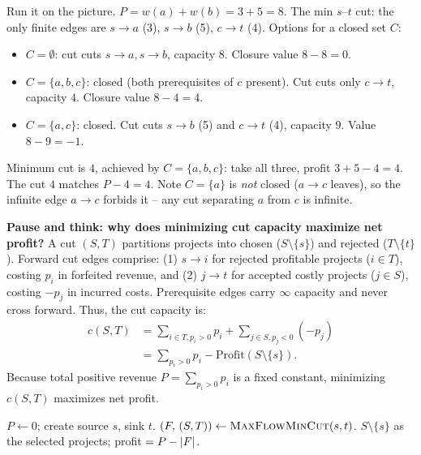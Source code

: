 \begin{labbox}
Run it on the picture. $P = w(a)+w(b) = 3+5 = 8$. The min $s$--$t$ cut: the only finite edges are $s\to a$ (3), $s\to b$ (5), $c\to t$ (4). Options for a closed set $C$:
\begin{itemize}
\item $C=\emptyset$: cut cuts $s\to a, s\to b$, capacity $8$. Closure value $8-8=0$.
\item $C=\{a,b,c\}$: closed (both prerequisites of $c$ present). Cut cuts only $c\to t$, capacity $4$. Closure value $8-4=4$.
\item $C=\{a,c\}$: closed. Cut cuts $s\to b$ (5) and $c\to t$ (4), capacity $9$. Value $8-9=-1$.
\end{itemize}
Minimum cut is $4$, achieved by $C=\{a,b,c\}$: take all three, profit $3+5-4 = 4$. The cut $4$ matches $P - 4 = 4$. Note $C=\{a\}$ is \emph{not} closed ($a\to c$ leaves), so the infinite edge $a\to c$ forbids it -- any cut separating $a$ from $c$ is infinite.
\end{labbox}

\begin{recoverybox}
\textbf{Pause and think: why does minimizing cut capacity maximize net profit?}
A cut $(S,T)$ partitions projects into chosen ($S\setminus\{s\}$) and rejected ($T\setminus\{t\}$). Forward cut edges comprise: (1) $s \to i$ for rejected profitable projects ($i\in T$), costing $p_i$ in forfeited revenue, and (2) $j \to t$ for accepted costly projects ($j\in S$), costing $-p_j$ in incurred costs. Prerequisite edges carry $\infty$ capacity and never cross forward. Thus, the cut capacity is:
\begin{align*}
  c(S,T) &= \sum_{i\in T, p_i>0} p_i + \sum_{j\in S, p_j<0} (-p_j) \\
         &= \sum_{p_i>0} p_i - \text{Profit}(S\setminus\{s\}).
\end{align*}
Because total positive revenue $P = \sum_{p_i>0} p_i$ is a fixed constant, minimizing $c(S,T)$ maximizes net profit.
\end{recoverybox}

\begin{algorithm}[H]
\caption{Project selection via maximum-weight closure}
\label{ch18:alg-projsel}
\DontPrintSemicolon
{}
$P \gets 0$; create source $s$, sink $t$.\;
$(F,\, (S,T)) \gets \textsc{MaxFlowMinCut}(s,t)$.\;
\Return $S\setminus\{s\}$ as the selected projects; profit $= P - \lvert F\rvert$.\;
\end{algorithm}

